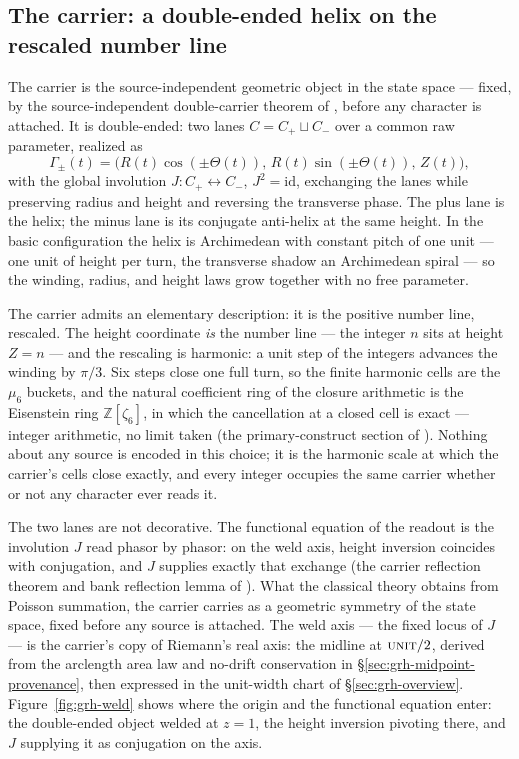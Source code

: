 \documentclass[11pt]{article}
\theoremstyle{definition}
\begin{document}
\subsection{The carrier: a double-ended helix on the rescaled number
line}\label{sec:grh-helix}

The carrier is the source-independent geometric object in the state space ---
fixed, by the source-independent double-carrier theorem of
\cite{UniversalCarrier}, before any character is
attached. It is double-ended: two lanes \(C=C_+\sqcup C_-\) over a common raw
parameter, realized as
\[
\Gamma_{\pm}(t)=\bigl(R(t)\cos(\pm\Theta(t)),\,R(t)\sin(\pm\Theta(t)),\,Z(t)\bigr),
\]
with the global involution \(J:C_+\leftrightarrow C_-\), \(J^2=\mathrm{id}\),
exchanging the lanes while preserving radius and height and reversing the
transverse phase. The plus lane is the helix; the minus lane is its conjugate
anti-helix at the same height. In the basic configuration the helix is
Archimedean with constant pitch of one unit --- one unit of height per turn,
the transverse shadow an Archimedean spiral --- so the winding, radius, and
height laws grow together with no free parameter.

The carrier admits an elementary description: it is the positive number line,
rescaled. The height coordinate \emph{is} the number line --- the integer
\(n\) sits at height \(Z=n\) --- and the rescaling is harmonic: a unit step
of the integers advances the winding by \(\pi/3\). Six steps close one full
turn, so the finite harmonic cells are the \(\mu_6\) buckets, and the natural
coefficient ring of the closure arithmetic is the Eisenstein ring
\(\mathbb Z[\zeta_6]\), in which the cancellation at a closed cell is exact
--- integer arithmetic, no limit taken (the primary-construct section of
\cite{UniversalCarrier}). Nothing about
any source is encoded in this choice; it is the harmonic scale at which the
carrier's cells close exactly, and every integer occupies the same carrier
whether or not any character ever reads it.

The two lanes are not decorative. The functional equation of the readout is
the involution \(J\) read phasor by phasor: on the weld axis, height inversion
coincides with conjugation, and \(J\) supplies exactly that exchange
(the carrier reflection theorem and bank reflection lemma of
\cite{UniversalCarrier}). What
the classical theory obtains from Poisson summation, the carrier carries as a
geometric symmetry of the state space, fixed before any source is attached.
The weld axis --- the fixed locus of \(J\) --- is the carrier's copy of
Riemann's real axis: the midline at \(\textsc{unit}/2\), derived from the
arclength area law and no-drift conservation in
\S\ref{sec:grh-midpoint-provenance}, then expressed in the unit-width chart
of \S\ref{sec:grh-overview}. Figure~\ref{fig:grh-weld} shows where the origin
and the functional equation enter: the double-ended object welded at
\(z=1\), the height inversion pivoting there, and \(J\) supplying it as
conjugation on the axis.
\end{document}
